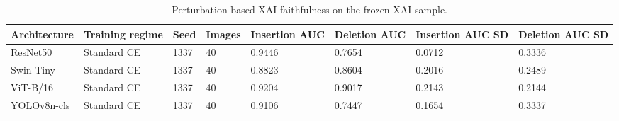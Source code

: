 \begin{table}
\caption{Perturbation-based XAI faithfulness on the frozen XAI sample.}
\label{tab:xai-faithfulness}
\begin{tabular}{llllllll}
\toprule
Architecture & Training regime & Seed & Images & Insertion AUC & Deletion AUC & Insertion AUC SD & Deletion AUC SD \\
\midrule
ResNet50 & Standard CE & 1337 & 40 & 0.9446 & 0.7654 & 0.0712 & 0.3336 \\
Swin-Tiny & Standard CE & 1337 & 40 & 0.8823 & 0.8604 & 0.2016 & 0.2489 \\
ViT-B/16 & Standard CE & 1337 & 40 & 0.9204 & 0.9017 & 0.2143 & 0.2144 \\
YOLOv8n-cls & Standard CE & 1337 & 40 & 0.9106 & 0.7447 & 0.1654 & 0.3337 \\
\bottomrule
\end{tabular}
\end{table}
